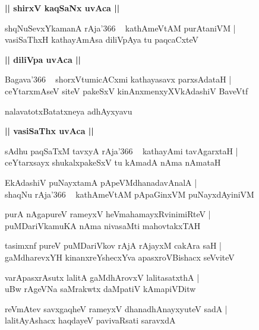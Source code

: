 \documentclass[twoside,12pt,openright]{book}
\newcounter{shloka}[chapter]
\def\uvaca#1{\centerline{{\large\textbf{#1}}}}
\begin{document}
\uvaca{|| shirxV kaqSaNx uvAca ||}

\begin{shloka}%
shqNuSevxYkamanA rAja\char'366 ~ kathAmeVtAM purAtaniVM |\\
vasiSaThxH kathayAmAsa diliVpAya tu paqcaCxteV 
\end{shloka}

\uvaca{|| diliVpa uvAca ||}

\begin{shloka}%
Bagava\char'366 ~ shorxVtumicACxmi kathayasavx parxsAdataH |\\
ceYtarxmAseV siteV pakeSxV kinAnxmenxyXVkAdashiV BaveVtf 
\end{shloka}

\begin{center}
nalavatotxBatatxneya adhAyxyavu
\end{center}

\uvaca{|| vasiSaThx uvAca ||}

\begin{shloka}%
sAdhu paqSaTxM tavxyA rAja\char'366 ~ kathayAmi tavAgarxtaH |\\
ceYtarxsayx shukalxpakeSxV tu kAmadA nAma nAmataH 
\end{shloka}

\begin{shloka}%
EkAdashiV puNayxtamA pApeVMdhanadavAnalA |\\
shaqNu rAja\char'366 ~ kathAmeVtAM pApaGinxVM puNayxdAyiniVM 
\end{shloka}

\begin{shloka}%
purA nAgapureV rameyxV heVmahamayxRvinimiRteV |\\
puMDariVkamuKA nAma nivasaMti mahovtakxTAH 
\end{shloka}

\begin{shloka}%
tasimxnf pureV puMDariVkov rAjA rAjayxM cakAra saH |\\
gaMdharevxYH kinanxreYshecxYva apasxroVBishacx seVviteV 
\end{shloka}

\begin{shloka}%
varApasxrAsutx lalitA gaMdhArovxV lalitasatxthA |\\
uBw rAgeVNa saMrakwtx daMpatiV kAmapiVDitw
\end{shloka}

\begin{shloka}%
reVmAtev savxgaqheV rameyxV dhanadhAnayxyuteV sadA |\\
lalitAyAshacx haqdayeV pavivaRsati saravxdA
\end{shloka}
\end{document}
